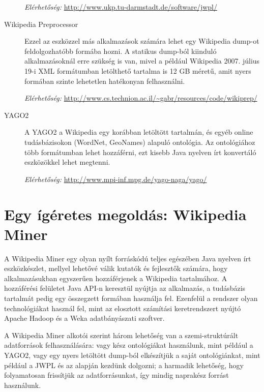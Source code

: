 \begin{description}
\textit{Elérhetőség:} \url{http://www.ukp.tu-darmstadt.de/software/jwpl/}

\item[Wikipedia Preprocessor] Ezzel az eszközzel más alkalmazások számára lehet egy Wikipedia dump-ot feldolgozhatóbb formába hozni. A statikus dump-ból kiinduló alkalmazásoknál erre szükség is van, mivel a például Wikipedia 2007. július 19-i XML formátumban letölthető tartalma is 12 GB méretű, amit nyers formában szinte lehetetlen hatékonyan felhasználni.
	
\textit{Elérhetőség:} \url{http://www.cs.technion.ac.il/~gabr/resources/code/wikiprep/}

\item[YAGO2\cite{yago2}] A YAGO2 a Wikipedia egy korábban letöltött tartalmán, és egyéb online tudásbázisokon (WordNet, GeoNames) alapuló ontológia. Az ontológiához több formátumban lehet hozzáférni, ezt kisebb Java nyelven írt konvertáló eszközökkel lehet megtenni.
	
\textit{Elérhetőség:} \url{http://www.mpi-inf.mpg.de/yago-naga/yago/}
\end{description}

\section{Egy ígéretes megoldás: Wikipedia Miner}
\label{sec:wikipediaminer}

A Wikipedia Miner egy olyan nyílt forráskódú teljes egészében Java nyelven írt eszközkészlet, mellyel lehetővé válik kutatók és fejlesztők számára, hogy alkalmazásukban egyszerűen hozzáférjenek a Wikipedia tartalmához. A hozzáférési felületet Java API-n keresztül nyújtja az alkalmazás, a tudásbázis tartalmát pedig egy összegzett formában használja fel. Ezenfelül a rendszer olyan technológiákat használ fel, mint az elosztott számítási keretrendszert nyújtó Apache Hadoop és a Weka adatbányászati szoftver.

A Wikipedia Miner alkotói szerint három lehetőség van a szemi-struktúrált adatforrások felhasználására: vagy kész ontológiákat használunk, mint például a YAGO2, vagy egy nyers letöltött dump-ból elkészítjük a saját ontológiánkat, mint például a JWPL és az alapján kezdünk dolgozni; a harmadik lehetőség, hogy folyamatosan frissítjük az adatforrásunkat, így mindig naprakész forrást használunk.

